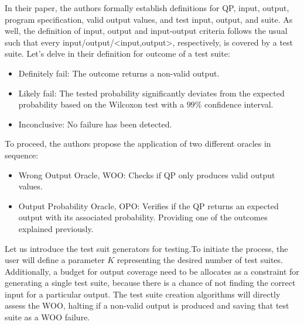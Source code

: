 \begin{itemize}
In their paper, the authors formally establish definitions for QP, input, output, program specification, valid output values, and test input, output, and suite. As well, the definition of input, output and input-output criteria follows the usual such that every input/output/<input,output>, respectively,  is covered by a test suite. Let's delve in their definition for outcome of a test suite:

\vspace{8pt}
\begin{itemize}
    \item Definitely fail: The outcome returns a non-valid output.
    \item Likely fail: The tested probability significantly deviates from the expected probability based on the Wilcoxon test with a $99\%$ confidence interval.
    \item Inconclusive: No failure has been detected.
\end{itemize}

To proceed, the authors propose the application of two different oracles in sequence:

\vspace{-3pt}
\begin{itemize}
    \item Wrong Output Oracle, WOO: Checks if QP only produces valid output values.
    \item Output Probability Oracle, OPO: Verifies if the QP returns an expected output with its associated probability. Providing one of the outcomes explained previously.
\end{itemize}

Let us introduce the test suit generators for testing.To initiate the process, the user will define a parameter $K$ representing the desired number of test suites. Additionally, a budget for output coverage need to be allocates as a constraint for generating a single test suite, because there is a chance of not finding the correct input for a particular output. The test suite creation algorithms will directly assess the WOO, halting if a non-valid output is produced and saving that test suite as a WOO failure.


\end{itemize}
